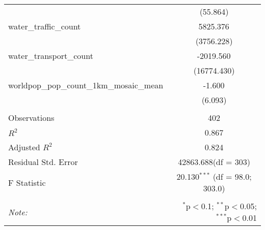 \begin{table}[!htbp]
\begin{tabular}{@{\extracolsep{5pt}}lc}
  & (55.864) \\
 water_traffic_count & 5825.376$^{}$ \\
  & (3756.228) \\
 water_transport_count & -2019.560$^{}$ \\
  & (16774.430) \\
 worldpop_pop_count_1km_mosaic_mean & -1.600$^{}$ \\
  & (6.093) \\
\hline \\[-1.8ex]
 Observations & 402 \\
 $R^2$ & 0.867 \\
 Adjusted $R^2$ & 0.824 \\
 Residual Std. Error & 42863.688(df = 303)  \\
 F Statistic & 20.130$^{***}$ (df = 98.0; 303.0) \\
\hline
\hline \\[-1.8ex]
\textit{Note:} & \multicolumn{1}{r}{$^{*}$p$<$0.1; $^{**}$p$<$0.05; $^{***}$p$<$0.01} \\
\end{tabular}
\end{table}